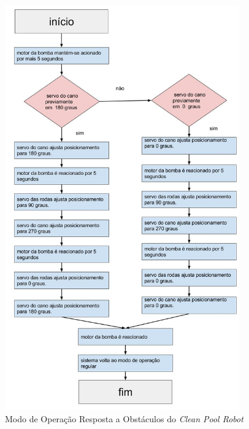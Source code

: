 \begin{figure}[h]
  \centering
  \includegraphics[width=0.9\textwidth]{figures/flow-robot-obstacle.jpg}
  \caption{Modo de Operação Resposta a Obstáculos do \textit{Clean Pool Robot}}
  \label{fig:flow-obstacle-robot}
\end{figure}
\FloatBarrier

